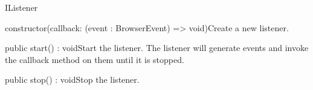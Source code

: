 \begin{interface}{IListener}



\begin{constructors}
\begin{constructor}{constructor(callback: (event : BrowserEvent) => void)}{Create a new listener.}
\begin{parameters}
\end{parameters}
\end{constructor}
\end{constructors}
\begin{methods}
\begin{method}{public start() : void}{Start the listener. The listener will generate events and invoke the callback method on them until it is stopped.}
\end{method}
\begin{method}{public stop() : void}{Stop the listener.}
\end{method}
\end{methods}
\end{interface}


